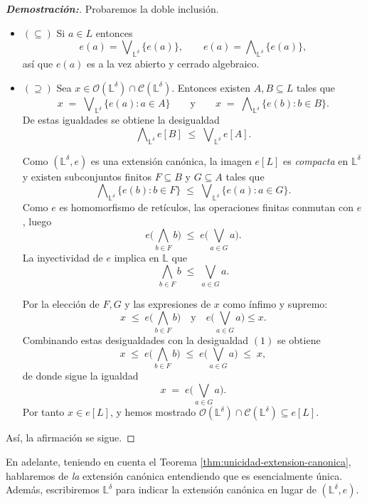\documentclass[12pt]{book}
\begin{document}
\begin{proof}[\textbf{Demostración:}]

Probaremos la doble inclusión.

\begin{itemize}
    \item $(\subseteq)$ Si $a\in L$ entonces
\[
e(a)=\bigvee\nolimits_{\mathbb{L}^\delta}\{e(a)\},
\qquad
e(a)=\bigwedge\nolimits_{\mathbb{L}^\delta}\{e(a)\},
\]
así que $e(a)$ es a la vez abierto y cerrado algebraico.

\item $(\supseteq)$ Sea $x\in\mathcal{O}(\mathbb{L}^\delta)\cap\mathcal{C}(\mathbb{L}^\delta)$.
Entonces existen $A,B\subseteq L$ tales que
\[
x \;=\; \bigvee\nolimits_{\mathbb{L}^\delta}\{e(a):a\in A\}
\qquad\text{y}\qquad
x \;=\; \bigwedge\nolimits_{\mathbb{L}^\delta}\{e(b):b\in B\}.
\]
De estas igualdades se obtiene la desigualdad
\[
\bigwedge\nolimits_{\mathbb{L}^\delta} e[B]
\;\le\;
\bigvee\nolimits_{\mathbb{L}^\delta} e[A].
\]

Como $(\mathbb{L}^\delta,e)$ es una extensión canónica, la imagen $e[L]$ es \emph{compacta} en $\mathbb{L}^\delta$ y existen subconjuntos finitos $F\subseteq B$ y $G\subseteq A$ tales que
\[
\bigwedge\nolimits_{\mathbb{L}^\delta}\{e(b):b\in F\}
\;\le\;
\bigvee\nolimits_{\mathbb{L}^\delta}\{e(a):a\in G\}.
\]
Como $e$ es homomorfismo de retículos, las operaciones finitas conmutan con $e$, luego
\[
e\!\bigl(\bigwedge_{b\in F} b\bigr)
\;\le\;
e\!\bigl(\bigvee_{a\in G} a\bigr).
\]
La inyectividad de $e$ implica en $\mathbb{L}$ que
\[
\bigwedge_{b\in F} b \;\le\; \bigvee_{a\in G} a.
\tag{$(1)$}
\]

Por la elección de $F,G$ y las expresiones de $x$ como ínfimo y supremo:
\[
x \;\le\; e\!\bigl(\bigwedge_{b\in F} b\bigr)
\quad\text{y}\quad
e\!\bigl(\bigvee_{a\in G} a\bigr)\le x.
\]
Combinando estas desigualdades con la desigualdad $(1)$ se obtiene
\[
x \;\le\; e\!\bigl(\bigwedge_{b\in F} b\bigr)
\;\le\;
e\!\bigl(\bigvee_{a\in G} a\bigr)
\;\le\; x,
\]
de donde sigue la igualdad
\[
x \;=\; e\!\bigl(\bigvee_{a\in G} a\bigr).
\]
Por tanto $x\in e[L]$, y hemos mostrado
$\mathcal{O}(\mathbb{L}^\delta)\cap\mathcal{C}(\mathbb{L}^\delta)\subseteq e[L]$.
\end{itemize}
Así, la afirmación se sigue. 
\end{proof}



En adelante, teniendo en cuenta el Teorema \ref{thm:unicidad-extension-canonica}, hablaremos de \emph{la} extensión canónica entendiendo que es esencialmente única. Además,  escribiremos \(\mathbb L^\delta\) para indicar la extensión canónica en lugar de \((\mathbb L^\delta,e)\).
\end{document}
